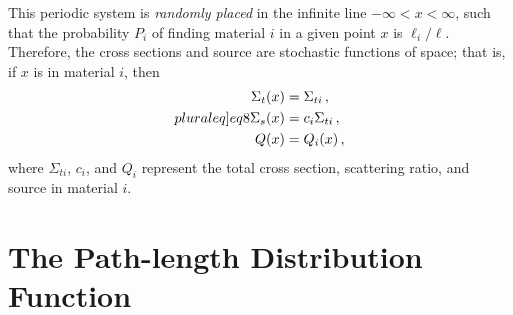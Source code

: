 \documentclass[12pt]{article}
\begin{document}
This periodic system is {\em randomly placed} in the infinite line $-\infty < x < \infty$, such that the probability $P_i$ of finding material $i$ in a given point $x$ is $\ell_i/\ell$.
Therefore, the cross sections and source are stochastic functions of space; that is, if $x$ is in material $i$, then
\begin{subequations}\label[pluraleq]{eq8}
\begin{align}
\Sigma_t(x) &= \Sigma_{ti}\, ,\\
\Sigma_s(x) &= c_i \Sigma_{ti}\, ,\\
Q(x) &= Q_i(x) \, ,
\end{align}
\end{subequations}
where $\Sigma_{ti}$, $c_i$, and $Q_i$ represent the total cross section, scattering ratio, and source in material $i$. 

\section{The Path-length Distribution Function}\label{sec3}
\end{document}

